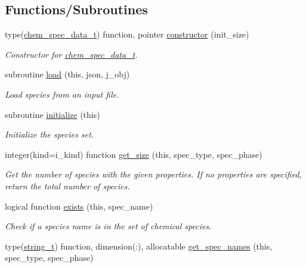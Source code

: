 \subsection*{Functions/\+Subroutines}
\begin{DoxyCompactItemize}
\item 
type(\mbox{\hyperlink{structpmc__chem__spec__data_1_1chem__spec__data__t}{chem\+\_\+spec\+\_\+data\+\_\+t}}) function, pointer \mbox{\hyperlink{namespacepmc__chem__spec__data_a2f8149f3510f9754aa917e7bce1467cb}{constructor}} (init\+\_\+size)
\begin{DoxyCompactList}\small\item\em Constructor for \mbox{\hyperlink{structpmc__chem__spec__data_1_1chem__spec__data__t}{chem\+\_\+spec\+\_\+data\+\_\+t}}. \end{DoxyCompactList}\item 
subroutine \mbox{\hyperlink{namespacepmc__chem__spec__data_a7115fe0b984c30ebb2dcc3ace92a7c7d}{load}} (this, json, j\+\_\+obj)
\begin{DoxyCompactList}\small\item\em Load species from an input file. \end{DoxyCompactList}\item 
subroutine \mbox{\hyperlink{namespacepmc__chem__spec__data_acf9c162e6310c8b0dbf3ee1b47a80f85}{initialize}} (this)
\begin{DoxyCompactList}\small\item\em Initialize the species set. \end{DoxyCompactList}\item 
integer(kind=i\+\_\+kind) function \mbox{\hyperlink{namespacepmc__chem__spec__data_a37e8dbcc45d70654ab71aea9980405fe}{get\+\_\+size}} (this, spec\+\_\+type, spec\+\_\+phase)
\begin{DoxyCompactList}\small\item\em Get the number of species with the given properties. If no properties are specified, return the total number of species. \end{DoxyCompactList}\item 
logical function \mbox{\hyperlink{namespacepmc__chem__spec__data_a79f0ac8d379625ad9a96f52db1a972c4}{exists}} (this, spec\+\_\+name)
\begin{DoxyCompactList}\small\item\em Check if a species name is in the set of chemical species. \end{DoxyCompactList}\item 
type(\mbox{\hyperlink{structpmc__util_1_1string__t}{string\+\_\+t}}) function, dimension(\+:), allocatable \mbox{\hyperlink{namespacepmc__chem__spec__data_aa41b3bc7544b5080624c9025768c3f3b}{get\+\_\+spec\+\_\+names}} (this, spec\+\_\+type, spec\+\_\+phase)

\end{DoxyCompactItemize}
